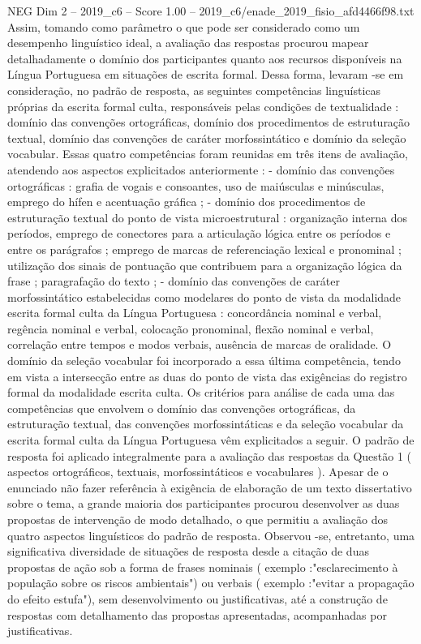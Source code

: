 \begin{textsample}{NEG Dim 2 – 2019\_c6 – Score 1.00 – 2019\_c6/enade\_2019\_fisio\_afd4466f98.txt}
Assim, tomando como parâmetro o que pode ser considerado como um desempenho linguístico ideal, a avaliação das respostas procurou mapear detalhadamente o domínio dos participantes quanto aos recursos disponíveis na Língua Portuguesa em situações de escrita formal.
Dessa forma, levaram -se em consideração, no padrão de resposta, as seguintes competências linguísticas próprias da escrita formal culta, responsáveis pelas condições de textualidade : domínio das convenções ortográficas, domínio dos procedimentos de estruturação textual, domínio das convenções de caráter morfossintático e domínio da seleção vocabular.
Essas quatro competências foram reunidas em três itens de avaliação, atendendo aos aspectos explicitados anteriormente : - domínio das convenções ortográficas : grafia de vogais e consoantes, uso de maiúsculas e minúsculas, emprego do hífen e acentuação gráfica ; - domínio dos procedimentos de estruturação textual do ponto de vista microestrutural : organização interna dos períodos, emprego de conectores para a articulação lógica entre os períodos e entre os parágrafos ; emprego de marcas de referenciação lexical e pronominal ; utilização dos sinais de pontuação que contribuem para a organização lógica da frase ; paragrafação do texto ; - domínio das convenções de caráter morfossintático estabelecidas como modelares do ponto de vista da modalidade escrita formal culta da Língua Portuguesa : concordância nominal e verbal, regência nominal e verbal, colocação pronominal, flexão nominal e verbal, correlação entre tempos e modos verbais, ausência de marcas de oralidade.
O domínio da seleção vocabular foi incorporado a essa última competência, tendo em vista a intersecção entre as duas do ponto de vista das exigências do registro formal da modalidade escrita culta.
Os critérios para análise de cada uma das competências que envolvem o domínio das convenções ortográficas, da estruturação textual, das convenções morfossintáticas e da seleção vocabular da escrita formal culta da Língua Portuguesa vêm explicitados a seguir.
O padrão de resposta foi aplicado integralmente para a avaliação das respostas da Questão 1 ( aspectos ortográficos, textuais, morfossintáticos e vocabulares ).
Apesar de o enunciado não fazer referência à exigência de elaboração de um texto dissertativo sobre o tema, a grande maioria dos participantes procurou desenvolver as duas propostas de intervenção de modo detalhado, o que permitiu a avaliação dos quatro aspectos linguísticos do padrão de resposta.
Observou -se, entretanto, uma significativa diversidade de situações de resposta desde a citação de duas propostas de ação sob a forma de frases nominais ( exemplo :"esclarecimento à população sobre os riscos ambientais") ou verbais ( exemplo :"evitar a propagação do efeito estufa"), sem desenvolvimento ou justificativas, até a construção de respostas com detalhamento das propostas apresentadas, acompanhadas por justificativas.

\end{textsample}
